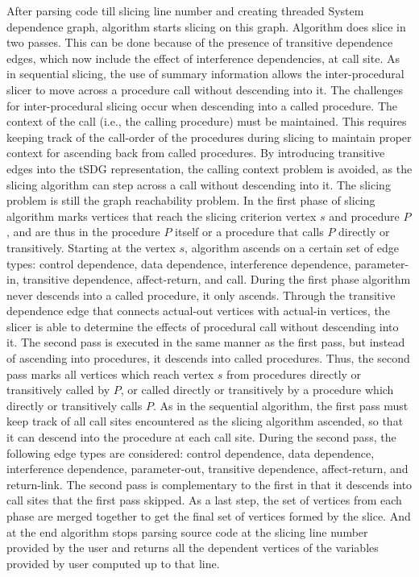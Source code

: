 \documentclass[conference]{IEEEtran}
\begin{document}
\par After parsing code till slicing line number and creating threaded System dependence graph, algorithm starts slicing on this graph. Algorithm does slice in two passes. This can be done because of the presence of transitive dependence edges, which now include the effect of interference dependencies, at call site. As in sequential slicing, the use of summary information allows the inter-procedural slicer to move across a procedure call without descending into it. The challenges for inter-procedural slicing occur when descending into a called procedure. The context of the call (i.e., the calling procedure) must be maintained. This requires keeping track of the call-order of the procedures during slicing to maintain proper context for ascending back from called procedures. By introducing transitive edges into the tSDG representation, the calling context problem is avoided, as the slicing algorithm can step across a call without descending into it. The slicing problem is still the graph reachability problem. In the first phase of slicing algorithm marks vertices that reach the slicing criterion vertex $s$ and procedure $P$, and are thus in the procedure $P$ itself or a procedure that calls $P$ directly or transitively. Starting at the vertex $s$, algorithm ascends on a certain set of edge types: control dependence, data dependence, interference dependence, parameter-in, transitive dependence, affect-return, and call. During the first phase algorithm never descends into a called procedure, it only ascends. Through the transitive dependence edge that connects actual-out vertices with actual-in vertices, the slicer is able to determine the effects of procedural call without descending into it. The second pass is executed in the same manner as the first pass, but instead of ascending into procedures, it descends into called procedures. Thus, the second pass marks all vertices which reach vertex $s$ from procedures directly or transitively called by $P$, or called directly or transitively by a procedure which directly or transitively calls $P$. As in the sequential algorithm, the first pass must keep track of all call sites encountered as the slicing algorithm ascended, so that it can descend into the procedure at each call site. During the second pass, the following edge types are considered: control dependence, data dependence, interference dependence, parameter-out, transitive dependence, affect-return, and return-link. The second pass is complementary to the first in that it descends into call sites that the first pass skipped. As a last step, the set of vertices from each phase are merged together to get the final set of vertices formed by the slice. And at the end algorithm stops parsing source code at the slicing line number provided by the user and returns all the dependent vertices of the variables provided by user computed up to that line.
\end{document}
